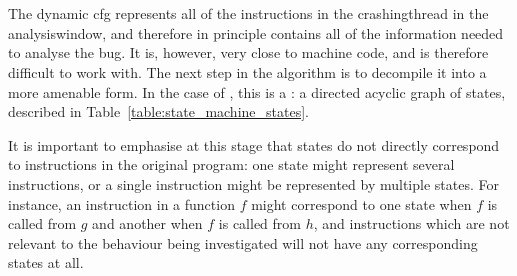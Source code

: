 \section{\STateMachines}
\label{sect:derive:state_machines}

The dynamic \gls{cfg} represents all of the instructions in the
\gls{crashingthread} in the \gls{analysiswindow}, and therefore in
principle contains all of the information needed to analyse the bug.
It is, however, very close to machine code, and is therefore difficult
to work with.  The next step in the algorithm is to decompile it into
a more amenable form.  In the case of {\technique}, this is a
{\StateMachine}: a directed acyclic graph of states, described in
Table~\ref{table:state_machine_states}.

It is important to emphasise at this stage that {\StateMachines}
states do not directly correspond to instructions in the original
program: one state might represent several instructions, or a single
instruction might be represented by multiple states.  For instance, an
instruction in a function $f$ might correspond to one state when $f$
is called from $g$ and another when $f$ is called from $h$, and
instructions which are not relevant to the behaviour being
investigated will not have any corresponding states at all.

